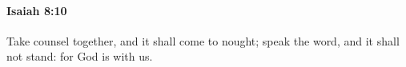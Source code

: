 
		\paragraph{Isaiah 8:10} %
			\label{ISAIAH-8-10}

			Take counsel together, and it shall come to nought; speak the word, and it shall not stand: for God is with us.


